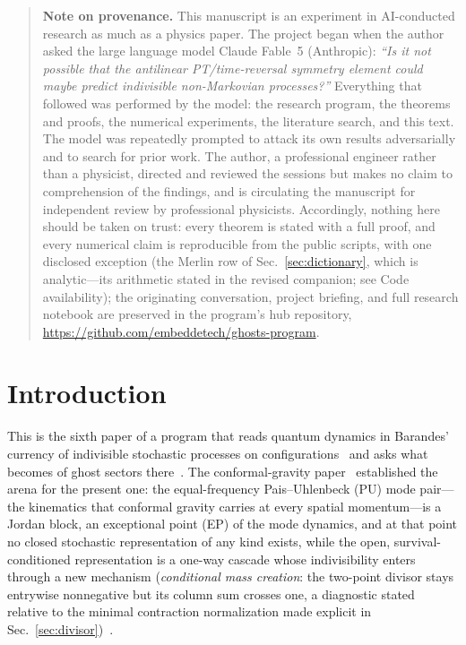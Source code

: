 ﻿\documentclass[11pt]{article}
\theoremstyle{remark}
\begin{document}
\newpage
\begin{quote}
\small\noindent\textbf{Note on provenance.} This manuscript is an
experiment in AI-conducted research as much as a physics paper. The
project began when the author asked the large language model Claude
Fable~5 (Anthropic): \emph{``Is it not possible that the antilinear
PT/time-reversal symmetry element could maybe predict indivisible
non-Markovian processes?''} Everything that followed was performed by
the model: the research program, the theorems and proofs, the numerical
experiments, the literature search, and this text. The model was
repeatedly prompted to attack its own results adversarially and to
search for prior work. The author, a professional engineer rather than
a physicist, directed and reviewed the sessions but makes no claim to
comprehension of the findings, and is circulating the manuscript for
independent review by professional physicists. Accordingly, nothing
here should be taken on trust: every theorem is stated with a full
proof, and every numerical claim is reproducible from the public
scripts, with one disclosed exception (the Merlin row of
Sec.~\ref{sec:dictionary}, which is analytic---its arithmetic stated in
the revised companion; see Code availability); the originating
conversation,
project briefing, and full research notebook are preserved in the
program's hub repository,
\url{https://github.com/embeddetech/ghosts-program}.
\end{quote}

\section{Introduction}
\label{sec:intro}

This is the sixth paper of a program
that reads quantum dynamics in
Barandes' currency of indivisible stochastic processes on
configurations~\cite{Barandes} and asks what becomes of ghost
sectors there~\cite{indivisible,instantaneous,conditioned,choosing}. The
conformal-gravity paper~\cite{choosing} established the arena for the present one: the
equal-frequency Pais--Uhlenbeck (PU) mode pair---the kinematics that
conformal gravity carries at every spatial momentum---is a Jordan
block, an exceptional point (EP) of the mode dynamics, and at that
point no closed stochastic representation of any kind exists, while
the open, survival-conditioned representation is a one-way cascade
whose indivisibility enters through a new mechanism (\emph{conditional
mass creation}: the two-point divisor stays entrywise nonnegative but
its column sum crosses one, a diagnostic stated relative to the
minimal contraction normalization made explicit in
Sec.~\ref{sec:divisor})~\cite{choosing}.
\end{document}
